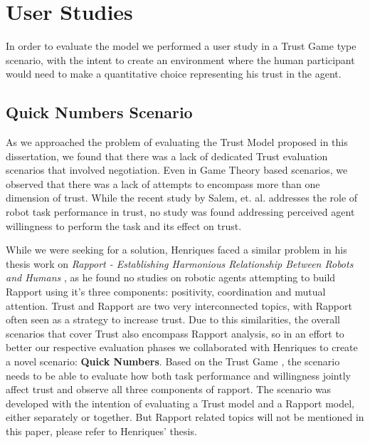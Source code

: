 
\section{User Studies}
\label{sec:UserStudies}

In order to evaluate the model we performed a user study in a Trust Game type scenario, with the intent to create an environment where the human participant would need to make a quantitative choice representing his trust in the agent. 

\subsection{Quick Numbers Scenario}
\label{subsec:QuickNumbersScenario}

As we approached the problem of evaluating the Trust Model proposed in this dissertation, we found that there was a lack of dedicated Trust evaluation scenarios that involved negotiation. Even in Game Theory based scenarios, we observed that there was a lack of attempts to encompass more than one dimension of trust. While the recent study by Salem, et. al. \cite{Salem2015b} addresses the role of robot task performance in trust, no study was found addressing perceived agent willingness to perform the task and its effect on trust. 

While we were seeking for a solution, Henriques faced a similar problem in his thesis work on \textit{Rapport - Establishing Harmonious Relationship Between Robots and Humans} \cite{Henriques2016}, as he found no studies on robotic agents attempting to build Rapport using it's three components: positivity, coordination and mutual attention. Trust and Rapport are two very interconnected topics, with Rapport often seen as a strategy to increase trust. Due to this similarities, the overall scenarios that cover Trust also encompass Rapport analysis, so in an effort to better our respective evaluation phases we collaborated with Henriques to create a novel scenario: \textbf{Quick Numbers}. Based on the Trust Game \cite{JoyceBergJohnDickhaut}, the scenario needs to be able to evaluate how both task performance and willingness jointly affect trust and observe all three components of rapport. The scenario was developed with the intention of evaluating a Trust model and a Rapport model, either separately or together. But Rapport related topics will not be mentioned in this paper, please refer to Henriques' thesis.


